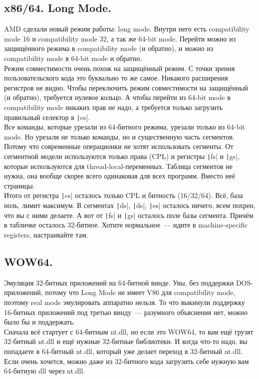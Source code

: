 \documentclass{article}
\begin{document}
    \subsection{x86/64. Long Mode.}
    AMD сделали новый режим работы: long mode. Внутри него есть compatibility mode 16 и compatibility mode 32, а так же 64-bit mode. Перейти можно из защищённого режима в compatibility mode (и обратно), и можно из compatibility mode в 64-bit mode и обратно.\\
    Режим совместимости очень похож на защищённый режим. С точки зрения пользовательского кода это буквально то же самое. Никакого расширения регистров не видно. Чтобы переключить режим совместимости на защищённый (и обратно), требуется нулевое кольцо. А чтобы перейти из 64-bit mode в compatibility mode никаких прав не надо, а требуется только загрузить правильный селектор в \texttt|cs|.\\
    Все команды, которые урезали из 64-битного режима, урезали только из 64-bit mode. Но урезали не только команды, но и существенную часть сегментов. Потому что современные операционки не хотят использовать сегменты. От сегментной модели используются только права (CPL) и регистры \texttt|fs| и \texttt|gs|, которые используются для thread-local-переменных. Таблица сегментов не нужна, она вообще скорее всего одинаковая для всех программ. Вместо неё страницы.\\
    Итого от регистра \texttt|cs| осталось только CPL и битность (16/32/64). Всё, база ноль, лимит максимум. В сегментах \texttt|ds|, \texttt|ds|, \texttt|es| осталось ничего, всем похрен, что вы с ними делаете. А вот от \texttt|fs| и \texttt|gs| осталось поле базы сегмента. Причём в табличке осталось 32-битное. Хотите нормальное~--- идите в machine-specific registers, настраивайте там.
    \subsection{WOW64.}
    Эмуляция 32-битных приложений на 64-битной винде. Увы, без поддержки DOS-приложений, потому что Long Mode не имеет V86 для compatibility mode, поэтому real mode эмулировать аппаратно нельзя. То что выкинули поддержку 16-битных приложений под третью винду~--- разумного объяснения нет, можно было бы и поддержать.\\
    Сначала всё стартует с 64-битным nt.dll, но если это WOW64, то вам ещё грузят 32-битный nt.dll и ещё нужные 32-битные библиотеки. И когда что-то надо, вы попадаете в 64-битный nt.dll, который уже делает переход в 32-битный nt.dll. Если очень хочется, можно даже из 32-битного кода загрузить себе нужную вам 64-битную dll через nt.dll.
\end{document}
